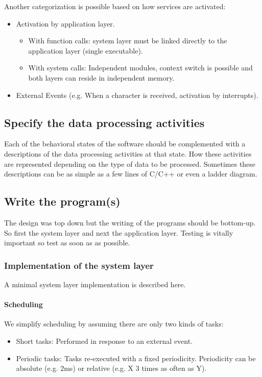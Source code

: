 \documentclass[../main.tex]{subfiles}
\begin{document}
Another categorization is possible based on how services are activated: 
\begin{itemize}
	\item Activation by application layer. 
	\begin{itemize}
		\item With function calls: system layer must be linked directly to the application layer (single executable). 
		\item With system calls: Independent modules, context switch is possible and both layers can reside in independent memory.  
	\end{itemize}
	\item External Events (e.g. When a character is received, activation by interrupts). 
\end{itemize}

\subsection{Specify the data processing activities}
\label{sss:activities}
Each of the behavioral states of the software should be complemented with a descriptions of the data processing activities at that state.
How these activities are represented depending on the type of data to be processed.
Sometimes these descriptions can be as simple as a few lines of C/C++ or even a ladder diagram.




\subsection{Write the program(s)}
\label{sss:write}
The design was top down but the writing of the programs should be bottom-up. So first the system layer and next the application layer. 
Testing is vitally important so test as soon as as possible.

\subsubsection{Implementation of the system layer}
A minimal system layer implementation is described here.

\paragraph{Scheduling}
We simplify scheduling by assuming there are only two kinds of tasks:
\begin{itemize}
	\item Short tasks: Performed in response to an external event.
	\item Periodic tasks: Tasks re-executed with a fixed periodicity. Periodicity can be absolute (e.g. 2ms) or relative (e.g. X 3 times as often as Y).
\end{itemize}
\end{document}

